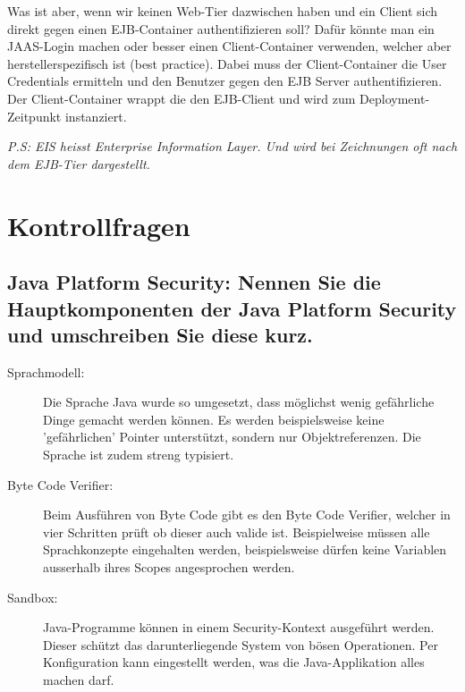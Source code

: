 Was ist aber, wenn wir keinen Web-Tier dazwischen haben und ein Client sich direkt gegen einen EJB-Container authentifizieren soll? Dafür könnte man ein JAAS-Login machen oder besser einen Client-Container verwenden, welcher aber herstellerspezifisch ist (best practice). Dabei muss der Client-Container die User Credentials ermitteln und den Benutzer gegen den EJB Server authentifizieren. Der Client-Container wrappt die den EJB-Client und wird zum Deployment-Zeitpunkt instanziert.

\emph{P.S: EIS heisst Enterprise Information Layer. Und wird bei Zeichnungen oft nach dem EJB-Tier dargestellt.} 







\section{Kontrollfragen}

\subsection{Java Platform Security: Nennen Sie die Hauptkomponenten der Java Platform Security und umschreiben Sie diese kurz.}

\begin{description}
	\item[Sprachmodell:] Die Sprache Java wurde so umgesetzt, dass möglichst wenig gefährliche Dinge gemacht werden können. Es werden beispielsweise keine 'gefährlichen' Pointer unterstützt, sondern nur Objektreferenzen. Die Sprache ist zudem streng typisiert.
	
	\item[Byte Code Verifier:] Beim Ausführen von Byte Code gibt es den Byte Code Verifier, welcher in vier Schritten prüft ob dieser auch valide ist. Beispielweise müssen alle Sprachkonzepte eingehalten werden, beispielsweise dürfen keine Variablen ausserhalb ihres Scopes angesprochen werden.
	
	\item[Sandbox:] Java-Programme können in einem Security-Kontext ausgeführt werden. Dieser schützt das darunterliegende System von bösen Operationen. Per Konfiguration kann eingestellt werden, was die Java-Applikation alles machen darf.
	
\end{description}

